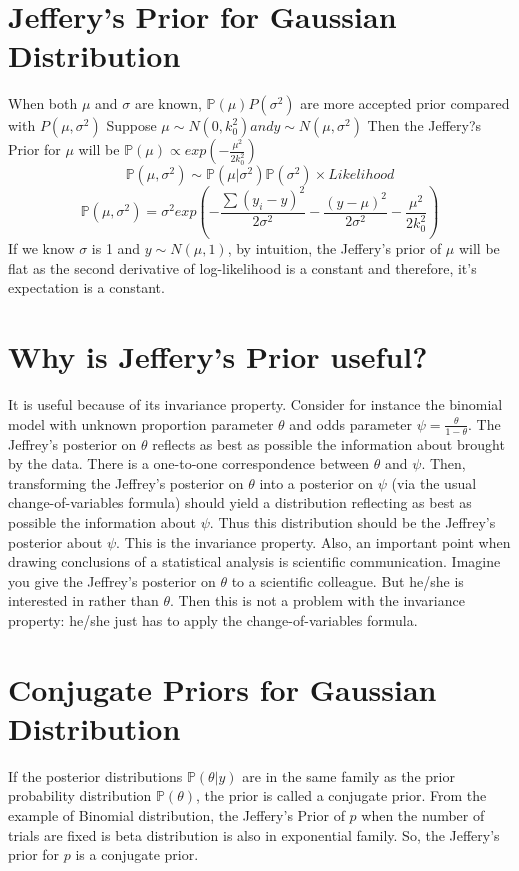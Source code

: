 \documentclass[twoside]{article}
\begin{document}
\section{Jeffery's Prior for Gaussian Distribution}
When both $\mu$ and $\sigma$ are known, $\mathbb P(\mu)P(\sigma^2)$ are more accepted prior compared with $P(\mu,\sigma^2)$
Suppose $\mu \sim N(0,k_0^2) and y \sim N(\mu, \sigma^2)$
Then the Jeffery?s Prior for $\mu$ will be $\mathbb P(\mu) \propto exp(- \frac{\mu^2}{2k_0^2})$
\[\mathbb P(\mu,\sigma^2) \sim \mathbb P(\mu | \sigma^2)\mathbb P(\sigma^2) \times Likelihood\]
\[\mathbb P(\mu,\sigma^2) = \sigma^2 exp(- \frac{\sum (y_i - y)^2}{2\sigma^2} - \frac{(y-\mu)^2}{2\sigma^2} - \frac{\mu^2}{2k_0^2})\]
If we know $\sigma$ is 1 and $y \sim N(\mu, 1)$, by intuition, the Jeffery's prior of $\mu$ will be flat as the second derivative of log-likelihood is a constant and therefore, it's expectation is a constant.

\section{ Why is Jeffery's Prior useful?}
It is useful because of its invariance property. Consider for instance the binomial model with unknown
proportion parameter $\theta$ and odds parameter $\psi = \frac{\theta}{1-\theta}$.
The Jeffrey's posterior on $\theta$ reflects as best as possible the information about brought by the data. There is a one-to-one correspondence between $\theta$ and $\psi$. Then, transforming the Jeffrey's posterior on $\theta$ into a posterior on $\psi$ (via the usual change-of-variables formula) should yield a distribution reflecting as best as possible the information about $\psi$. Thus this distribution should be the Jeffrey's posterior about $\psi$. This is the invariance property.
Also, an important point when drawing conclusions of a statistical analysis is scientific communication.
Imagine you give the Jeffrey's posterior on $\theta$ to a scientific colleague. But he/she is interested in rather than $\theta$. Then this is not a problem with the invariance property: he/she just has to apply the change-of-variables formula.

\section{Conjugate Priors for Gaussian Distribution}

If the posterior distributions $\mathbb P(\theta |y)$ are in the same family as the prior probability distribution $\mathbb P(\theta)$, the prior is called a conjugate prior. From the example of Binomial distribution, the Jeffery's Prior of $p$ when the number of trials are fixed is beta distribution is also in exponential family. So, the Jeffery's prior for $p$ is a conjugate prior.
\end{document}
